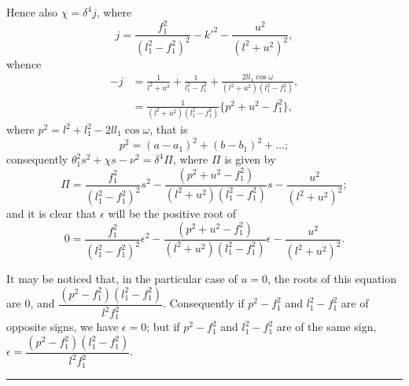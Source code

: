 \documentclass[11pt,a4paper]{book}
\begin{document}
Hence also $\chi = \delta^4 j$, where
\[
j = \frac{f_1^2}{(l_1^2-f_1^2)^2} - k'^2 - \frac{u^2}{(l^2+u^2)^2},
\]
whence
\begin{align*}
-j &= \frac{1}{l^2+u^2} + \frac{1}{l_1^2-f_1^2} + \frac{2ll_1 \cos \omega}{(l^2+u^2)(l_1^2-f_1^2)},\\
&= \frac{1}{(l^2+u^2)(l_1^2-f_1^2)} \{p^2 + u^2 - f_1^2\},
\end{align*}
where $p^2 = l^2 + l_1^2 - 2ll_1 \cos \omega$, that is
\[
p^2 = (a-a_1)^2 + (b-b_1)^2 + \ldots;
\]
consequently $\theta_1^2 s^2 + \chi s - \nu^2 = \delta^4 \Pi$, where $\Pi$ is given by
\[
\Pi = \frac{f_1^2}{(l_1^2-f_1^2)^2} s^2 - \frac{(p^2+u^2-f_1^2)}{(l^2+u^2)(l_1^2-f_1^2)} s - \frac{u^2}{(l^2+u^2)^2};
\]
and it is clear that $\epsilon$ will be the positive root of
\[
0 = \frac{f_1^2}{(l_1^2-f_1^2)^2} \epsilon^2 - \frac{(p^2+u^2-f_1^2)}{(l^2+u^2)(l_1^2-f_1^2)} \epsilon - \frac{u^2}{(l^2+u^2)^2}.
\]

It may be noticed that, in the particular case of $u = 0$, the roots of this equation are $0$, and $\dfrac{(p^2-f_1^2)(l_1^2-f_1^2)}{l^2 f_1^2}$. Consequently if $p^2-f_1^2$ and $l_1^2-f_1^2$ are of opposite signs, we have $\epsilon = 0$; but if $p^2-f_1^2$ and $l_1^2-f_1^2$ are of the same sign, $\epsilon = \dfrac{(p^2-f_1^2)(l_1^2-f_1^2)}{l^2 f_1^2}$.

\vspace{1em}
\noindent\rule{\textwidth}{0.4pt}
\vspace{0.5em}
\end{document}
